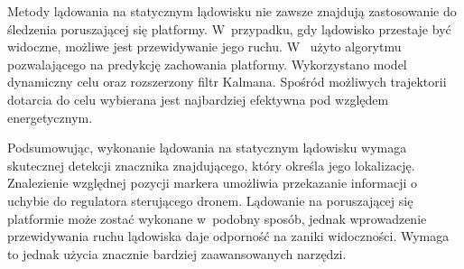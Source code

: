 Metody lądowania na statycznym lądowisku nie zawsze znajdują zastosowanie do śledzenia poruszającej się platformy. %
W~przypadku, gdy lądowisko przestaje być widoczne, możliwe jest przewidywanie jego ruchu.  
W~\cite{Falanga} użyto algorytmu pozwalającego na predykcję zachowania platformy. 
Wykorzystano model dynamiczny celu oraz rozszerzony filtr Kalmana. 
Spośród możliwych trajektorii dotarcia do celu wybierana jest najbardziej efektywna pod względem energetycznym.\par


 
Podsumowując, wykonanie lądowania na statycznym lądowisku wymaga skutecznej detekcji znacznika znajdującego, który określa jego lokalizację. 
Znalezienie względnej pozycji markera umożliwia przekazanie informacji o uchybie do regulatora sterującego dronem. 
Lądowanie na poruszającej się platformie może zostać wykonane w~podobny sposób, jednak wprowadzenie przewidywania ruchu lądowiska daje odporność na zaniki widoczności. %
Wymaga to jednak użycia znacznie bardziej zaawansowanych narzędzi. %








